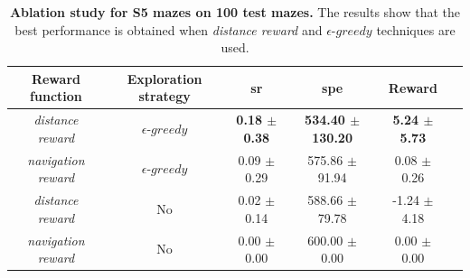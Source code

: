 \begin{table}
    \centering
    \begin{tabular}{c c c c c c}
        \toprule
        Reward function            & Exploration strategy     & \acrshort{sr}            & \acrshort{spe}               & Reward                   \\
        \midrule
        \textit{distance reward}   & $\epsilon\text{-}greedy$ & \textbf{0.18 $\pm$ 0.38} & \textbf{534.40 $\pm$ 130.20} & \textbf{5.24 $\pm$ 5.73} \\
        \textit{navigation reward} & $\epsilon\text{-}greedy$ & 0.09 $\pm$ 0.29          & 575.86 $\pm$ 91.94           & 0.08 $\pm$ 0.26          \\
        \textit{distance reward}   & No                       & 0.02 $\pm$ 0.14          & 588.66 $\pm$ 79.78           & -1.24 $\pm$ 4.18         \\
        \textit{navigation reward} & No                       & 0.00 $\pm$ 0.00          & 600.00 $\pm$ 0.00            & 0.00 $\pm$ 0.00          \\
        \bottomrule
    \end{tabular}
    \caption{\textbf{Ablation study for S5 mazes on 100 test mazes.} The results show that the best performance is obtained when \textit{distance reward} and $\epsilon\text{-}greedy$ techniques are used.}
    \label{tab:ablation-study}
\end{table}

